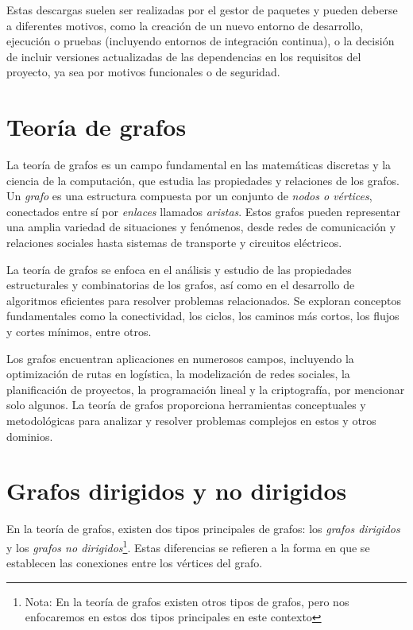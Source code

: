 Estas descargas suelen ser realizadas por el gestor de paquetes y pueden deberse a diferentes motivos,
como la creación de un nuevo entorno de desarrollo, ejecución o pruebas (incluyendo entornos de
integración continua), o la decisión de incluir versiones actualizadas de las dependencias en los
requisitos del proyecto, ya sea por motivos funcionales o de seguridad.

\section{Teoría de grafos}

La teoría de grafos es un campo fundamental en las matemáticas discretas y la ciencia de la computación,
que estudia las propiedades y relaciones de los grafos. Un \textit{grafo} es una estructura compuesta
por un conjunto de \textit{nodos o vértices}, conectados entre sí por \textit{enlaces} llamados \textit{aristas}.
Estos grafos pueden representar una amplia variedad de situaciones y fenómenos, desde redes de
comunicación y relaciones sociales hasta sistemas de transporte y circuitos eléctricos.

La teoría de grafos se enfoca en el análisis y estudio de las propiedades estructurales y combinatorias
de los grafos, así como en el desarrollo de algoritmos eficientes para resolver problemas relacionados.
Se exploran conceptos fundamentales como la conectividad, los ciclos, los caminos más cortos, los flujos
y cortes mínimos, entre otros.

Los grafos encuentran aplicaciones en numerosos campos, incluyendo la optimización de rutas en
logística, la modelización de redes sociales, la planificación de proyectos, la programación lineal
y la criptografía, por mencionar solo algunos. La teoría de grafos proporciona herramientas conceptuales
y metodológicas para analizar y resolver problemas complejos en estos y otros dominios.

\section{Grafos dirigidos y no dirigidos}

En la teoría de grafos, existen dos tipos principales de grafos: los \textit{grafos dirigidos} y
los \textit{grafos no dirigidos}\footnote{Nota: En la teoría de grafos existen otros tipos de grafos,
    pero nos enfocaremos en estos dos tipos principales en este contexto}. Estas diferencias se
refieren a la forma en que se establecen las conexiones entre los vértices del grafo.

